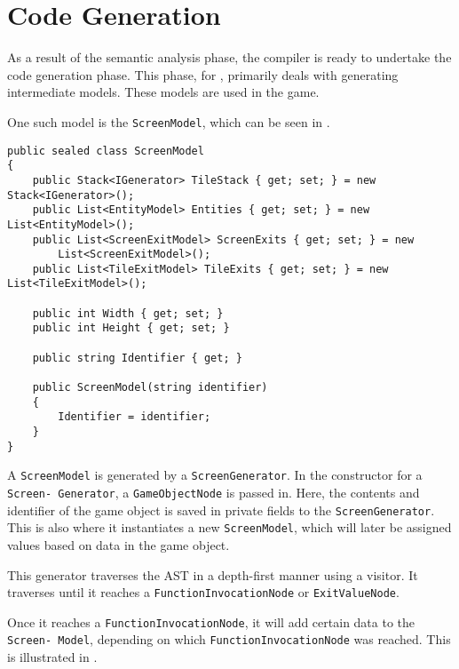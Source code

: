 \section{Code Generation} \label{sec:code_generation}
As a result of the semantic analysis phase, the \dazel{} compiler is ready to undertake the code generation phase.
This phase, for \dazel{}, primarily deals with generating intermediate models. These models are used in the \dazel{} game.

One such model is the \texttt{ScreenModel}, which can be seen in .

\begin{lstlisting}[language=CSharp, label={lst:screenmodel}, caption={The \texttt{ScreenModel} class.}]
public sealed class ScreenModel
{
    public Stack<IGenerator> TileStack { get; set; } = new Stack<IGenerator>();
    public List<EntityModel> Entities { get; set; } = new List<EntityModel>();
    public List<ScreenExitModel> ScreenExits { get; set; } = new 
        List<ScreenExitModel>();
    public List<TileExitModel> TileExits { get; set; } = new List<TileExitModel>();

    public int Width { get; set; }
    public int Height { get; set; }
    
    public string Identifier { get; }

    public ScreenModel(string identifier)
    {
        Identifier = identifier;
    }
}
\end{lstlisting}

A \texttt{ScreenModel} is generated by a \texttt{ScreenGenerator}. 
In the constructor for a \texttt{Screen-
Generator}, a \texttt{GameObjectNode} is passed in. Here, the contents and identifier of the game object is saved in private fields to the \texttt{ScreenGenerator}. This is also where it instantiates a new \texttt{ScreenModel}, which will later be assigned values based on data in the game object.  

This generator traverses the AST in a depth-first manner using a visitor. It traverses until it reaches a \texttt{FunctionInvocationNode} or \texttt{ExitValueNode}.

Once it reaches a \texttt{FunctionInvocationNode}, it will add certain data to the \texttt{Screen-
Model}, depending on which \texttt{FunctionInvocationNode} was reached. 
This is illustrated in .

